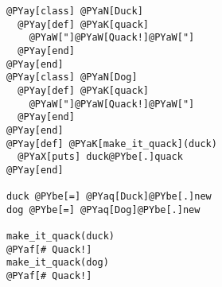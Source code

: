 \begin{Verbatim}[commandchars=@\[\]]
@PYay[class] @PYaN[Duck]
  @PYay[def] @PYaK[quack]
    @PYaW["]@PYaW[Quack!]@PYaW["]
  @PYay[end]
@PYay[end]
@PYay[class] @PYaN[Dog]
  @PYay[def] @PYaK[quack]
    @PYaW["]@PYaW[Quack!]@PYaW["]
  @PYay[end]
@PYay[end]
@PYay[def] @PYaK[make_it_quack](duck)
  @PYaX[puts] duck@PYbe[.]quack
@PYay[end]

duck @PYbe[=] @PYaq[Duck]@PYbe[.]new
dog @PYbe[=] @PYaq[Dog]@PYbe[.]new

make_it_quack(duck)
@PYaf[# Quack!]
make_it_quack(dog)
@PYaf[# Quack!]
\end{Verbatim}
